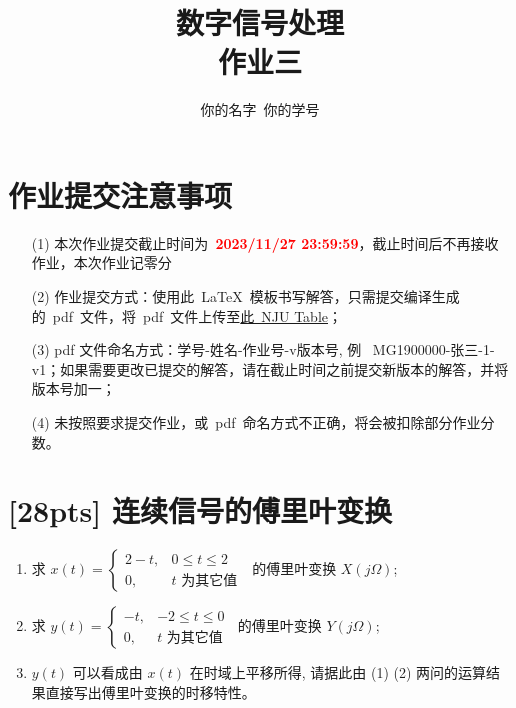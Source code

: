 \documentclass[tikz,a4paper,UTF8]{article}
\numberwithin{equation}{section}
\begin{document}
\title{数字信号处理\\
    作业三}
\author{你的名字\, 你的学号}
\maketitle

\section*{作业提交注意事项}
\begin{tcolorbox}
    \begin{enumerate}
        \item[(1)] 本次作业提交截止时间为~\textcolor{red}{\textbf{2023/11/27  23:59:59}}，截止时间后不再接收作业，本次作业记零分        
        \item[(2)] 作业提交方式：使用此~\LaTeX~模板书写解答，只需提交编译生成的~pdf~文件，将~pdf~文件上传至\href{https://table.nju.edu.cn/dtable/forms/b6525acd-3a73-44e0-bee4-ab17bf98f172/}{此~NJU Table}；
        \item[(3)] pdf 文件命名方式：学号-姓名-作业号-v版本号, 例~ MG1900000-张三-1-v1；如果需要更改已提交的解答，请在截止时间之前提交新版本的解答，并将版本号加一；
        \item[(4)] 未按照要求提交作业，或~pdf~命名方式不正确，将会被扣除部分作业分数。

    \end{enumerate}
\end{tcolorbox}


\newpage
\section{[28pts] 连续信号的傅里叶变换}
\begin{enumerate}[(1)]
    \item 求 $x(t)=\left\{\begin{array}{rl}2-t, & 0 \leq t \leq 2 \\ 0, & t \text { 为其它值 }\end{array}\right.$ 的傅里叶变换 $X(j \Omega)$;
    \item 求 $y(t)=\left\{\begin{array}{rl}-t, & -2 \leq t \leq 0 \\ 0, & t \text { 为其它值 }\end{array}\right.$ 的傅里叶变换 $Y(j \Omega)$;
    \item $y(t)$ 可以看成由 $x(t)$ 在时域上平移所得, 请据此由 (1) (2) 两问的运算结果直接写出傅里叶变换的时移特性。
\end{enumerate}
\end{document}
